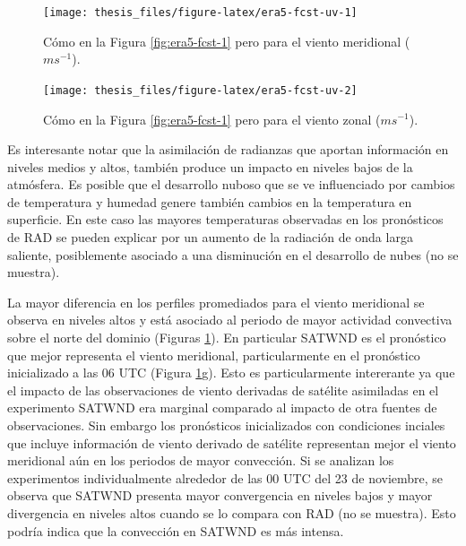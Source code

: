 \documentclass[12pt,oneside,a4paper]{reedthesis}
\begin{document}
\begin{figure}[ht]

{\centering \texttt{[image: thesis\_files/figure-latex/era5-fcst-uv-1]} 

}

\caption{Cómo en la Figura \ref{fig:era5-fcst-1} pero para el viento meridional (\(ms^{-1}\)).}\label{fig:era5-fcst-uv-1}
\end{figure}
\begin{figure}[ht]

{\centering \texttt{[image: thesis\_files/figure-latex/era5-fcst-uv-2]} 

}

\caption{Cómo en la Figura \ref{fig:era5-fcst-1} pero para el viento zonal (\(ms^{-1}\)).}\label{fig:era5-fcst-uv-2}
\end{figure}
Es interesante notar que la asimilación de radianzas que aportan información en niveles medios y altos, también produce un impacto en niveles bajos de la atmósfera. Es posible que el desarrollo nuboso que se ve influenciado por cambios de temperatura y humedad genere también cambios en la temperatura en superficie. En este caso las mayores temperaturas observadas en los pronósticos de RAD se pueden explicar por un aumento de la radiación de onda larga saliente, posiblemente asociado a una disminución en el desarrollo de nubes (no se muestra).

La mayor diferencia en los perfiles promediados para el viento meridional se observa en niveles altos y está asociado al periodo de mayor actividad convectiva sobre el norte del dominio (Figuras \ref{fig:era5-fcst-uv-1}). En particular SATWND es el pronóstico que mejor representa el viento meridional, particularmente en el pronóstico inicializado a las 06 UTC (Figura \ref{fig:era5-fcst-uv-1}g). Esto es particularmente intererante ya que el impacto de las observaciones de viento derivadas de satélite asimiladas en el experimento SATWND era marginal comparado al impacto de otra fuentes de observaciones. Sin embargo los pronósticos inicializados con condiciones inciales que incluye información de viento derivado de satélite representan mejor el viento meridional aún en los periodos de mayor convección. Si se analizan los experimentos individualmente alrededor de las 00 UTC del 23 de noviembre, se observa que SATWND presenta mayor convergencia en niveles bajos y mayor divergencia en niveles altos cuando se lo compara con RAD (no se muestra). Esto podría indica que la convección en SATWND es más intensa.
\end{document}
